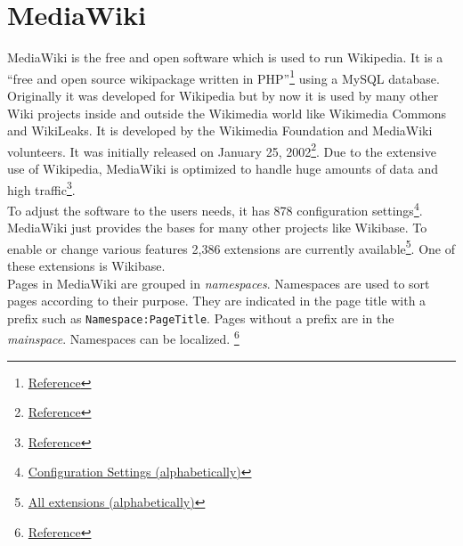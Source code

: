 \section{MediaWiki}

MediaWiki is the free and open software which is used to run Wikipedia. It is a ``free and open source wikipackage written in PHP''\footnote{\href{https://www.mediawiki.org/wiki/MediaWiki}{Reference}} using a MySQL database. Originally it was developed for Wikipedia but by now it is used by many other Wiki projects inside and outside the Wikimedia world like Wikimedia Commons and WikiLeaks. It is developed by the Wikimedia Foundation and MediaWiki volunteers. It was initially released on January 25, 2002\footnote{\href{https://en.wikipedia.org/wiki/MediaWiki}{Reference}}. Due to the extensive use of Wikipedia, MediaWiki is optimized to handle huge amounts of data and high traffic\footnote{\href{https://www.mediawiki.org/w/index.php?title=Manual:What_is_MediaWiki\%3F&oldid=743778}{Reference}}. \\
To adjust the software to the users needs, it has 878 configuration settings\footnote{\href{https://www.mediawiki.org/wiki/Manual:Configuration_settings_\%28alphabetical\%29}{Configuration Settings (alphabetically)}}. \\
MediaWiki just provides the bases for many other projects like Wikibase. To enable or change various features 2,386 extensions are currently available\footnote{\href{https://www.mediawiki.org/wiki/Category:All_extensions}{All extensions (alphabetically)}}. One of these extensions is Wikibase. \\
Pages in MediaWiki are grouped in \textit{namespaces}. Namespaces are used to sort pages according to their purpose. They are indicated in the page title with a prefix such as \texttt{Namespace:PageTitle}. Pages without a prefix are in the \textit{mainspace}. Namespaces can be localized. \footnote{\href{https://www.mediawiki.org/wiki/Help:Namespaces}{Reference}}